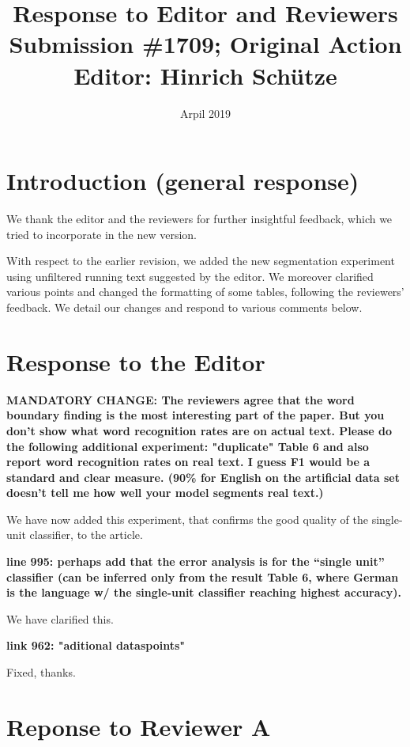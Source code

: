\documentclass{article}[11pt,a4paper,oneside]
\title{Response to Editor and Reviewers \\ {\large Submission \#1709; Original Action Editor: Hinrich Sch{\"u}tze}}
\date{Arpil 2019}
\begin{document}
\maketitle


\section{Introduction (general response)}

We thank the editor and the reviewers for further insightful feedback, which we tried to incorporate in the new version.

With respect to the earlier revision, we added the new segmentation experiment using unfiltered running text suggested by the editor. We moreover clarified various points and changed the formatting of some tables, following the reviewers' feedback. We detail our changes and respond to various comments below.

\section{Response to the Editor}

\textbf{
MANDATORY CHANGE: The reviewers agree that the word boundary
finding is the most interesting part of the paper. But you
don't show what word recognition rates are on actual
text.  Please do the following additional experiment:
"duplicate" Table 6 and also report word recognition rates
on real text. I guess F1 would be a standard and clear
measure. (90\% for English on the artificial data set doesn't
tell me how well your model segments real text.)}

We have now added this experiment, that confirms the good quality of the single-unit classifier, to the article.\newline

\textbf{
line 995: perhaps add that the error analysis is for the
``single unit'' classifier (can be inferred only from the
result Table 6, where German is the language w/ the
single-unit classifier reaching highest accuracy).}

We have clarified this.\newline

\textbf{
link 962: "aditional dataspoints"}

Fixed, thanks.

\section{Reponse to Reviewer A}
\end{document}
